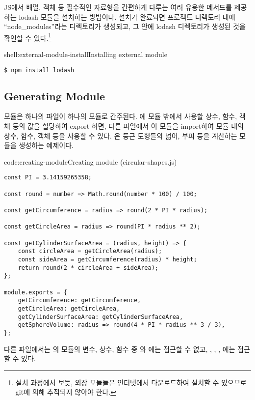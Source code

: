 \은 JS에서 배열, 객체 등 필수적인 자료형을 간편하게 다루는 여러 유용한 메서드를 제공하는 lodash 모듈을 설치하는 방법이다. 설치가 완료되면 프로젝트 디렉토리 내에 ``node\_modules''라는 디렉토리가 생성되고, 그 안에 lodash 디렉토리가 생성된 것을 확인할 수 있다.\footnote{설치 과정에서 보듯, 외장 모듈들은 인터넷에서 다운로드하여 설치할 수 있으므로 git에 의해 추적되지 않아야 한다.}

\begin{shell}{shell:external-module-install}{Installing external module}
\begin{verbatim}
$ npm install lodash
\end{verbatim}
\end{shell}

\subsection*{Generating Module}

모듈은 하나의 파일이 하나의 모듈로 간주된다. 에 모듈 밖에서 사용할 상수, 함수, 객체 등의 값을 할당하여 export 하면, 다른 파일에서 이 모듈을 import하여 모듈 내의 상수, 함수, 객체 등을 사용할 수 있다. 은 둥근 도형들의 넓이, 부피 등을 계산하는 모듈을 생성하는 예제이다.

\begin{code}{code:creating-module}{Creating module (circular-shapes.js)}
\begin{verbatim}
const PI = 3.14159265358;

const round = number => Math.round(number * 100) / 100;

const getCircumference = radius => round(2 * PI * radius);

const getCircleArea = radius => round(PI * radius ** 2);

const getCylinderSurfaceArea = (radius, height) => {
    const circleArea = getCircleArea(radius);
    const sideArea = getCircumference(radius) * height;
    return round(2 * circleArea + sideArea);
};

module.exports = {
    getCircumference: getCircumference,
    getCircleArea: getCircleArea,
    getCylinderSurfaceArea: getCylinderSurfaceArea,
    getSphereVolume: radius => round(4 * PI * radius ** 3 / 3),
};
\end{verbatim}
\end{code}

다른 파일에서는 의 모듈의 변수, 상수, 함수 중 와 에는 접근할 수 없고, , , , 에는 접근할 수 있다.

